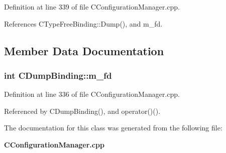 Definition at line 339 of file CConfiguration\-Manager.cpp.

References CType\-Free\-Binding::Dump(), and m\_\-fd.

\subsection{Member Data Documentation}
\subsubsection{\setlength{\rightskip}{0pt plus 5cm}int CDump\-Binding::m\_\-fd\hspace{0.3cm}{\tt  [private]}}\label{classCDumpBinding_o0}




Definition at line 336 of file CConfiguration\-Manager.cpp.

Referenced by CDump\-Binding(), and operator()().

The documentation for this class was generated from the following file:\begin{CompactItemize}
\item 
{\bf CConfiguration\-Manager.cpp}\end{CompactItemize}
